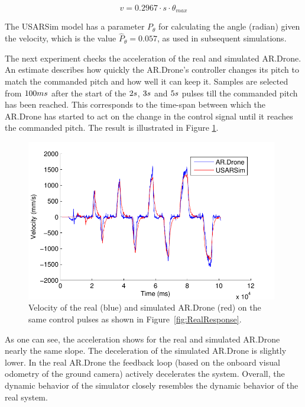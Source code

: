 \begin{equation}
v = 0.2967 \cdot s \cdot \theta_{max}
\label{eq:conversion}
\end{equation}

The USARSim model has a parameter $P_\theta$ for calculating the angle (radian) given the velocity, which
is the value $\hat{P}_\theta = 0.057$, as used in subsequent simulations.

The next experiment checks the acceleration of the real and simulated AR.Drone.
An estimate describes how quickly the AR.Drone's controller changes its pitch to match the commanded pitch and how well it can keep it.
Samples are selected from $100\small{ms}$ after the start
of the $2\small{s}$, $3\small{s}$ and $5\small{s}$ pulses till the commanded pitch has been reached.
This
corresponds to the time-span between which the AR.Drone has started to act on the change in the control
signal until it reaches the commanded pitch. The result is illustrated in Figure \ref{fig:ComparisonOfResponse}.

\begin{figure}[htb]
\centering
\includegraphics[width=11cm]{images/RYtdB-eps-converted-to.pdf}
\caption{Velocity of the real (blue) and simulated AR.Drone (red) on the same control pulses as shown in Figure~\ref{fig:RealResponse}.}

\label{fig:ComparisonOfResponse}
\end{figure}

As one can see, the acceleration shows for the real and simulated AR.Drone nearly the same slope. The deceleration of the simulated AR.Drone is slightly lower. In the real AR.Drone the feedback loop (based on the onboard visual odometry of the ground camera) actively decelerates the system. Overall, the dynamic behavior of the simulator closely resembles the dynamic behavior of the real system.




